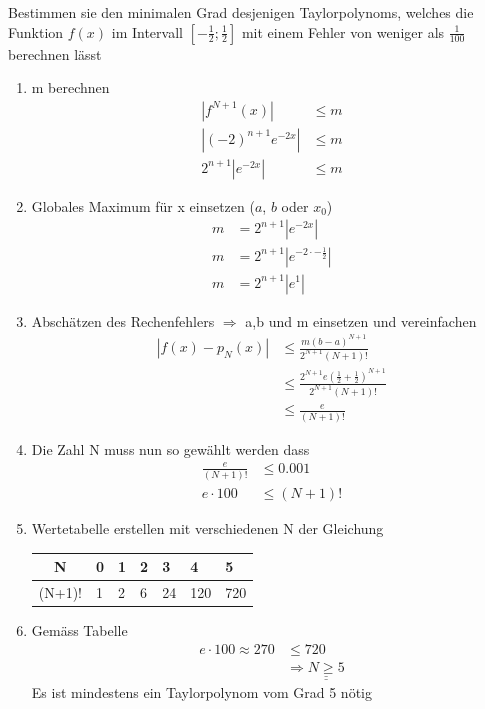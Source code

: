 Bestimmen sie den minimalen Grad desjenigen Taylorpolynoms, welches die Funktion $f(x)$ im Intervall $\left[ -\frac{1}{2};\frac{1}{2} \right]$ mit einem Fehler von weniger als $\frac{1}{100}$ berechnen lässt
\begin{enumerate}
	\item m berechnen
	\begin{align*}
		|f^{N+1}(x)| &\leq m \\
		|(-2)^{n+1} e^{-2x}|  &\leq m \\
		2^{n+1} |e^{-2x}|  &\leq m 
	\end{align*}
	\item Globales Maximum für x einsetzen ($a$, $b$ oder $x_0$)
	\begin{align*}
		m &= 2^{n+1} |e^{-2x}| \\
		m &= 2^{n+1} |e^{-2 \cdot -\frac{1}{2}}| \\
		m &= 2^{n+1} |e^{1}|
	\end{align*}
	\item Abschätzen des Rechenfehlers $\Rightarrow$ a,b und m einsetzen und vereinfachen
	\begin{align*}
		|f(x) - p_{N}(x) | &\leq \frac{m(b-a)^{N+1}}{2^{N+1}(N+1)!} \\
		&\leq \frac{2^{N+1} e(\frac{1}{2} + \frac{1}{2})^{N+1}}{2^{N+1}(N+1)!} \\
		&\leq \frac{e}{(N+1)!}
	\end{align*}
	\item Die Zahl N muss nun so gewählt werden dass
	\begin{align*}
	\frac{e}{(N+1)!} &\leq 0.001 \\
	e \cdot 100 &\leq (N+1)!
	\end{align*}
	\item Wertetabelle erstellen mit verschiedenen N der Gleichung \hfill \\
	\begin{tabu} to \linewidth {c l l l l l l}
		\toprule
		N & 0 & 1 & 2 & 3 & 4 & 5\\
		\midrule
		(N+1)! & 1  & 2 & 6 & 24 & 120 & 720 \\
		\bottomrule
	\end{tabu}
	\item Gemäss Tabelle
	\begin{align*}
		e \cdot 100 \approx 270 &\leq 720 \\
		&\Rightarrow \underline{\underline{N \geq5}}
	\end{align*}
	Es ist mindestens ein Taylorpolynom vom Grad 5 nötig
\end{enumerate}


